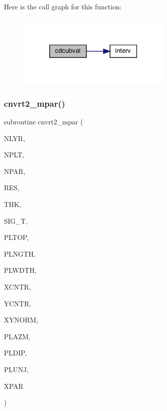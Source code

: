 Here is the call graph for this function\+:\nopagebreak
\begin{figure}[H]
\begin{center}
\leavevmode
\includegraphics[width=213pt]{Leroi__c_8f90_ab28d8a79c971f683b68fae4db0553909_cgraph}
\end{center}
\end{figure}
\mbox{\label{Leroi__c_8f90_a747a5bf7d69f6533bc2f54572584ba0c}} 
\subsubsection{\texorpdfstring{cnvrt2\+\_\+mpar()}{cnvrt2\_mpar()}}
{\footnotesize\ttfamily subroutine cnvrt2\+\_\+mpar (\begin{DoxyParamCaption}\item[{integer}]{N\+L\+YR,  }\item[{integer}]{N\+P\+LT,  }\item[{integer}]{N\+P\+AR,  }\item[{real, dimension(nlyr)}]{R\+ES,  }\item[{real, dimension(nlyr)}]{T\+HK,  }\item[{real, dimension(nplt)}]{S\+I\+G\+\_\+T,  }\item[{real, dimension(nplt)}]{P\+L\+T\+OP,  }\item[{real, dimension(nplt)}]{P\+L\+N\+G\+TH,  }\item[{real, dimension(nplt)}]{P\+L\+W\+D\+TH,  }\item[{real, dimension(nplt)}]{X\+C\+N\+TR,  }\item[{real, dimension(nplt)}]{Y\+C\+N\+TR,  }\item[{real, dimension(nplt)}]{X\+Y\+N\+O\+RM,  }\item[{real, dimension(nplt)}]{P\+L\+A\+ZM,  }\item[{real, dimension(nplt)}]{P\+L\+D\+IP,  }\item[{real, dimension(nplt)}]{P\+L\+U\+NJ,  }\item[{real, dimension(npar)}]{X\+P\+AR }\end{DoxyParamCaption})}

